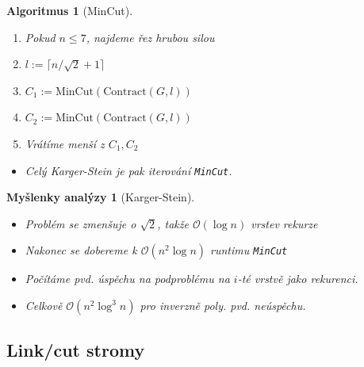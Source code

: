 \documentclass{article}
\theoremstyle{noparens}
\newtheorem*{alg}{Algoritmus}
\theoremstyle{noparens-mys}
\newtheorem*{anal-mys}{Myšlenky analýzy}
\theoremstyle{noparens-note}
\newcommand{\OO}{\mathcal{O}}
\begin{document}
\begin{alg}[MinCut]
    ~

    \begin{enumerate}
        \item Pokud $n \le 7$, najdeme řez hrubou silou
        \item $l := \lceil n / \sqrt{2} + 1 \rceil$
        \item $C_1 := \text{MinCut}(\text{Contract}(G, l))$
        \item $C_2 := \text{MinCut}(\text{Contract}(G, l))$
        \item Vrátíme menší z $C_1, C_2$
    \end{enumerate}

    \begin{itemize}
        \item Celý Karger-Stein je pak iterování \texttt{MinCut}.
    \end{itemize}
\end{alg}

\begin{anal-mys}[Karger-Stein]
    ~

    \begin{itemize}
        \item Problém se zmenšuje o $\sqrt{2}$, takže $\OO(\log n)$ vrstev rekurze
        \item Nakonec se dobereme k $\OO(n^2 \log n)$ runtimu \texttt{MinCut}
        \item Počítáme pvd. úspěchu na podproblému na $i$-té vrstvě jako
            rekurenci.
        \item Celkově $\OO(n^2 \log^3 n)$ pro inverzně poly. pvd. neúspěchu.
    \end{itemize}
\end{anal-mys}


\subsection{Link/cut stromy}
\end{document}
